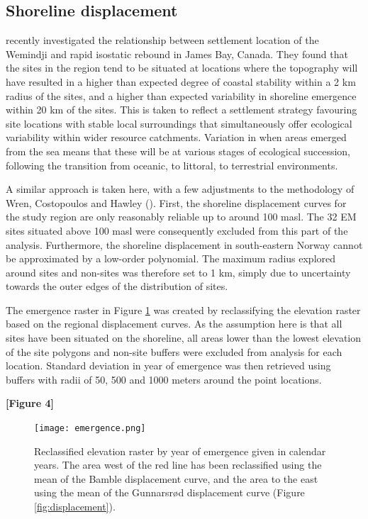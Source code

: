 \documentclass[12pt, a4paper]{article}
\begin{document}
\subsection{Shoreline displacement}
\cite{wren2018} recently investigated the relationship between settlement location of the Wemindji and rapid isostatic rebound in James Bay, Canada. They found that the sites in the region tend to be situated at locations where the topography will have resulted in a higher than expected degree of coastal stability within a 2 km radius of the sites, and a higher than expected variability in shoreline emergence within 20 km of the sites. This is taken to reflect a settlement strategy favouring site locations with stable local surroundings that simultaneously offer ecological variability within wider resource catchments. Variation in when areas emerged from the sea means that these will be at various stages of ecological succession, following the transition from oceanic, to littoral, to terrestrial environments. \par 
A similar approach is taken here, with a few adjustments to the methodology of Wren, Costopoulos and Hawley (\citeyear[][]{wren2018}). First, the shoreline displacement curves for the study region are only reasonably reliable up to around 100 masl. The 32 EM sites situated above 100 masl were consequently excluded from this part of the analysis. Furthermore, the shoreline displacement in south-eastern Norway cannot be approximated by a low-order polynomial. The maximum radius explored around sites and non-sites was therefore set to 1 km, simply due to uncertainty towards the outer edges of the distribution of sites. \par The emergence raster in Figure \ref{fig:emerge} was created by reclassifying the elevation raster based on the regional displacement curves. As the assumption here is that all sites have been situated on the shoreline, all areas lower than the lowest elevation of the site polygons and non-site buffers were excluded from analysis for each location. Standard deviation in year of emergence was then retrieved using buffers with radii of 50, 500 and 1000 meters around the point locations. \par

\smallskip
\textbf{[Figure 4]}
\smallskip

\begin{figure}
	\centering
	\texttt{[image: emergence.png]}
	\caption{Reclassified elevation raster by year of emergence given in calendar years. The area west of the red line has been reclassified using the mean of the Bamble displacement curve, and the area to the east using the mean of the Gunnarsr{\o}d displacement curve (Figure \ref{fig:displacement}).}
	\label{fig:emerge}
\end{figure} 
\end{document}
